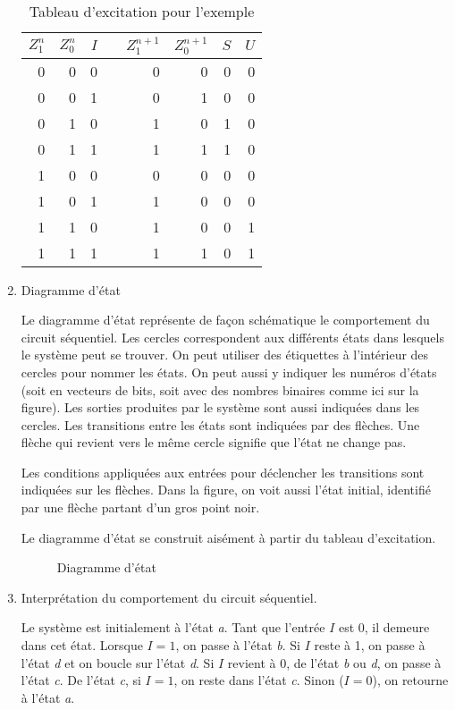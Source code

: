 \documentclass[11pt]{article}
\begin{document}
\begin{enumerate}
\begin{table}[htbp]
\caption{\label{tab:org25b512f}Tableau d'excitation pour l'exemple}
\centering
\begin{tabular}{rrrlrrrr}
\(Z_1^n\) & \(Z_0^n\) & \(I\) &  & \(Z_1^{n+1}\) & \(Z_0^{n+1}\) & \(S\) & \(U\)\\
\hline
0 & 0 & 0 &  & 0 & 0 & 0 & 0\\
0 & 0 & 1 &  & 0 & 1 & 0 & 0\\
0 & 1 & 0 &  & 1 & 0 & 1 & 0\\
0 & 1 & 1 &  & 1 & 1 & 1 & 0\\
1 & 0 & 0 &  & 0 & 0 & 0 & 0\\
1 & 0 & 1 &  & 1 & 0 & 0 & 0\\
1 & 1 & 0 &  & 1 & 0 & 0 & 1\\
1 & 1 & 1 &  & 1 & 1 & 0 & 1\\
\end{tabular}
\end{table}

\item Diagramme d'état

Le diagramme d'état représente de façon schématique le comportement du
circuit séquentiel. Les cercles correspondent aux différents états
dans lesquels le système peut se trouver. On peut utiliser des
étiquettes à l'intérieur des cercles pour nommer les états. On peut
aussi y indiquer les numéros d'états (soit en vecteurs de bits, soit
avec des nombres binaires comme ici sur la figure). Les sorties
produites par le système sont aussi indiquées dans les cercles.  Les
transitions entre les états sont indiquées par des flèches. Une flèche
qui revient vers le même cercle signifie que l'état ne change pas.

Les conditions appliquées aux entrées pour déclencher les transitions
sont indiquées sur les flèches. Dans la figure, on voit aussi l'état
initial, identifié par une flèche partant d'un gros point noir.

Le diagramme d'état se construit aisément à partir du tableau
d'excitation.

\begin{figure}[htbp]
\centering

\caption{\label{fig:org7dcb318}Diagramme d'état}
\end{figure}

\item Interprétation du comportement du circuit séquentiel.

Le système est initialement à l'état \emph{a}. Tant que l'entrée \(I\) est 0,
il demeure dans cet état. Lorsque \(I=1\), on passe à l'état \emph{b}. Si
\(I\) reste à 1, on passe à l'état \emph{d} et on boucle sur l'état \emph{d}. Si
\(I\) revient à 0, de l'état \emph{b} ou \emph{d}, on passe à l'état \emph{c}. De l'état \emph{c},
si \(I = 1\), on reste dans l'état \emph{c}. Sinon (\(I = 0\)), on retourne à
l'état \emph{a}.


\end{enumerate}
\end{document}
